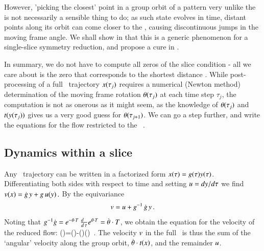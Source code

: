 \documentclass[preprint,12pt]{elsarticle} %
\begin{document}
However, 'picking the closest' point in a group orbit of a pattern very unlike
the {\template} is not necessarily a sensible thing to do; as such state
evolves in time, distant points along its orbit can come closer to the
{\template}, causing discontinuous jumps in the moving frame angle. We
shall show in  that this is a generic phenomenon for a
single-slice symmetry reduction, and propose a cure in .

In summary, we do not have to compute all zeros of the slice condition
 - all we care about is the zero that
corresponds to the shortest distance .
While post-processing of a full \statesp\ trajectory $x(\tau_j)$
requires a numerical (Newton method) determination of the
moving frame rotation
${\bf \theta}(\tau_j)$ at each time step $\tau_j$, the computation is not
as onerous as it might seem, as the knowledge of ${\bf \theta}(\tau_j)$ and
$t(y(\tau_j))$
gives us a very good guess for ${\bf \theta}(\tau_{j+1})$. We
can go a step further, and write the equations for the flow restricted to
the \reducedsp\ \pSRed.

\subsection{Dynamics within a slice}
\label{sec:mslices}

Any \statesp\ trajectory can be written in a factorized
form $x(\tau)=g(\tau)
y(\tau)$. Differentiating both sides with respect to time and
setting $u={dy}/{d\tau}$ we find
\(
v(x)=\dot{g} \, y+g \, u(y)
\,.
\)
By the equivariance 
\[
v=u + g^{-1} \, \dot{g} \, y
\,.
\]
Noting that $g^{-1}\dot{g}=e^{-{\bf \theta} \cdot T} \,
\frac{d ~~}{d \, \tau} e^{{\bf \theta} \cdot T}=\dot{{\bf \theta}}\cdot T$,
we obtain the equation for the velocity of the reduced flow:
\beq
\velRed(\sspRed)=\vel(\sspRed)-\dot{\gSpace}(\sspRed)\cdot \groupTan(\sspRed)
\,.
The velocity $v$ in the full \statesp\ is thus the sum of the
`angular' velocity  along the group orbit,
$\dot{{\bf \theta}} \cdot t(x)$, and the remainder $u$.
\end{document}
